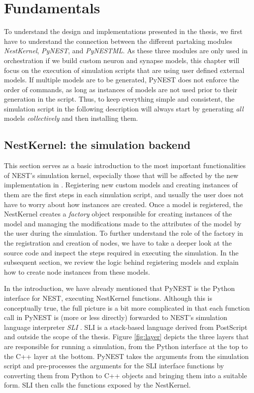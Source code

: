 \chapter{Fundamentals}
\label{chap:funds}


To understand the design and implementations presented in the thesis, we first have to understand the connection between the different partaking modules \emph{NestKernel}, \emph{PyNEST}, and \emph{PyNESTML}. As these three modules are only used in orchestration if we build custom neuron and synapse models, this chapter will focus on the execution of simulation scripts that are using user defined external models. If multiple models are to be generated, PyNEST does not enforce the order of commands, as long as instances of models are not used prior to their generation in the script. Thus, to keep everything simple and consistent, the simulation script in the following description will always start by generating \emph{all} models \emph{collectively} and then installing them.

\section{NestKernel: the simulation backend}

This section serves as a basic introduction to the most important functionalities of NEST's simulation kernel, especially those that will be affected by the new implementation in . Registering new custom models and creating instances of them are the first steps in each simulation script, and usually the user does not have to worry about how instances are created. Once a model is registered, the NestKernel creates a \emph{factory} object responsible for creating instances of the model and managing the modifications made to the attributes of the model by the user during the simulation. To further understand the role of the factory in the registration and creation of nodes, we have to take a deeper look at the source code and inspect the steps required in executing the simulation. In the subsequent section, we review the logic behind registering models and explain how to create node instances from these models.

In the introduction, we have already mentioned that PyNEST is the Python interface for NEST, executing NestKernel functions. Although this is conceptually true, the full picture is a bit more complicated in that each function call in PyNEST is (more or less directly) forwarded to NEST's simulation language interpreter \emph{SLI} \citep{gewaltig2007nest}. SLI is a stack-based language derived from PostScript \citep{adobe1990postscript} and outside the scope of the thesis. Figure \ref{fig:layer} depicts the three layers that are responsible for running a simulation, from the Python interface at the top to the C++ layer at the bottom. PyNEST takes the arguments from the simulation script and pre-processes the arguments for the SLI interface functions by converting them from Python to C++ objects and bringing them into a suitable form. SLI then calls the functions exposed by the NestKernel.

